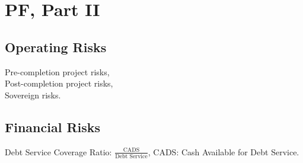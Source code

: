 \section{PF, Part II}
	\subsection*{Operating Risks}
	Pre-completion project risks,\\
	Post-completion project risks,\\
	Sovereign risks.
	
	\subsection*{Financial Risks}
	Debt Service Coverage Ratio: $\frac{\text{CADS}}{\text{Debt Service}}$, CADS: Cash Available for Debt Service.
